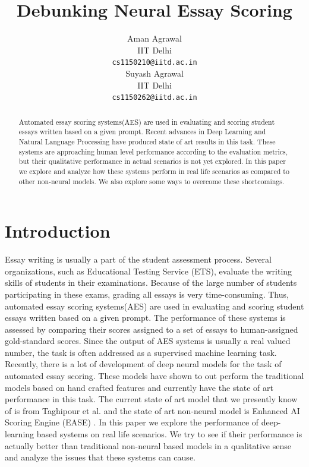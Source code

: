 \documentclass[11pt,a4paper]{article}
\title{Debunking Neural Essay Scoring}
\author{Aman Agrawal \\
  IIT Delhi \\
  {\tt cs1150210@iitd.ac.in} \\\And
  Suyash Agrawal \\
  IIT Delhi \\
  {\tt cs1150262@iitd.ac.in} \\}
\date{}
\begin{document}
\maketitle
\begin{abstract}
  Automated essay scoring systems(AES) are used in evaluating and scoring student essays written based on a given prompt. Recent advances in Deep Learning and Natural Language Processing have produced state of art results in this task. These systems are approaching human level performance according to the evaluation metrics, but their qualitative performance in actual scenarios is not yet explored. In this paper we explore and analyze how these systems perform in real life scenarios as compared to other non-neural models. We also explore some ways to overcome these shortcomings.
\end{abstract}

\section{Introduction}

Essay writing is usually a part of the student assessment  process. Several  organizations, such as Educational Testing Service (ETS)\cite{ets}, evaluate the writing skills of students in their examinations. Because of the large number of students participating in these exams, grading all essays is very time-consuming. 
Thus, automated essay scoring systems(AES) are used in evaluating and scoring student essays written based on a given prompt. The performance of these systems is assessed by comparing their scores assigned to a set of essays to human-assigned gold-standard scores.
Since the output of AES systems is usually a real valued number, the task is often addressed as a supervised machine learning task.
Recently, there is a lot of development of deep neural models for the task of automated essay scoring.
These models have shown to out perform the traditional models based on hand crafted features and currently have the state of art performance in this task. The current state of art model that we presently know of is from Taghipour et al. \cite{nea} and the state of art non-neural model is Enhanced AI Scoring Engine (EASE) \cite{ease}.
In this paper we explore the performance of deep-learning based systems on real life scenarios. We try to see if their performance is actually better than traditional non-neural based models in a qualitative sense and analyze the issues that these systems can cause.
\end{document}
